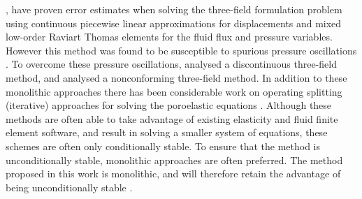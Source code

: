 \citet{phillips2007coupling,phillips2007couplingtwo}, have proven error estimates when solving the three-field formulation problem using continuous piecewise linear approximations for displacements and mixed low-order Raviart Thomas elements for the fluid flux and pressure variables. However this method was found to be susceptible to spurious pressure oscillations \citep[see,][]{phillips2009overcoming}. To overcome these pressure oscillations, \citet{li2012discontinuous} analysed a discontinuous three-field method, and \citet{yi2013coupling} analysed a nonconforming three-field method.
In addition to these monolithic approaches there has been considerable work on operating splitting (iterative) approaches for solving the poroelastic equations \citep{wheeler2007iteratively,feng2010fully,kim2011stability}. Although these methods are often able to take advantage of existing elasticity and fluid finite element software, and result in solving a smaller system of equations, these schemes are often only conditionally stable. To ensure that the method is unconditionally stable, monolithic approaches are often preferred. The method proposed in this work is monolithic, and will therefore retain the advantage of being unconditionally stable .








